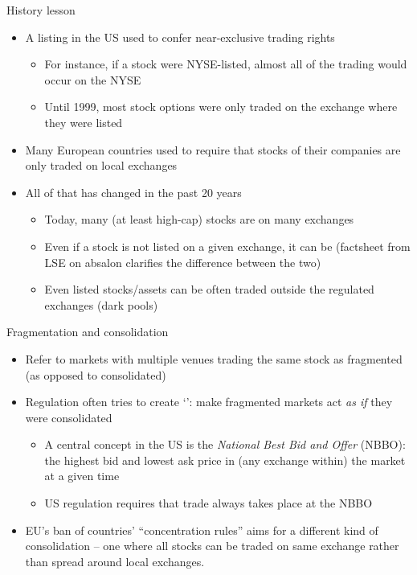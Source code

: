 \documentclass[english,10pt
,aspectratio=169
]{beamer}
\begin{document}
\begin{frame}{History lesson}
	\begin{itemize}
		\item A listing in the US used to confer near-exclusive trading rights
		\begin{itemize}
			\item For instance, if a stock were NYSE-listed, almost all of the trading would occur on the NYSE
			\item Until 1999, most stock options were only traded on the exchange where they were listed
		\end{itemize}
		\item Many European countries used to require that stocks of their companies are only traded on local exchanges
		\pause
		\item All of that has changed in the past 20 years
		\begin{itemize}
			\item Today, many (at least high-cap) stocks are  on many exchanges
			\item Even if a stock is not listed on a given exchange, it can be  
			(factsheet from LSE on absalon clarifies the difference between the two)
			\item Even listed stocks/assets can be often traded outside the regulated exchanges (dark pools)
		\end{itemize}
	\end{itemize}
\end{frame}


\begin{frame}{Fragmentation and consolidation}
	\begin{itemize}
		\item Refer to markets with multiple venues trading the same stock as \alert{fragmented} (as opposed to consolidated)
		\item Regulation often tries to create `': make fragmented markets act \textit{as if} they were consolidated
		\begin{itemize}
			\item A central concept in the US is the \textit{National Best Bid and Offer} (NBBO): the highest bid and lowest ask price in (any exchange within) the market at a given time
			\item US regulation requires that trade always takes place at the NBBO
		\end{itemize}
		\pause
		\item EU's \alert{ban} of countries' ``\alert{concentration rules}'' aims for a different kind of consolidation -- one where all stocks can be traded on same exchange rather than spread around local exchanges.
	\end{itemize}
\end{frame}
\end{document}
